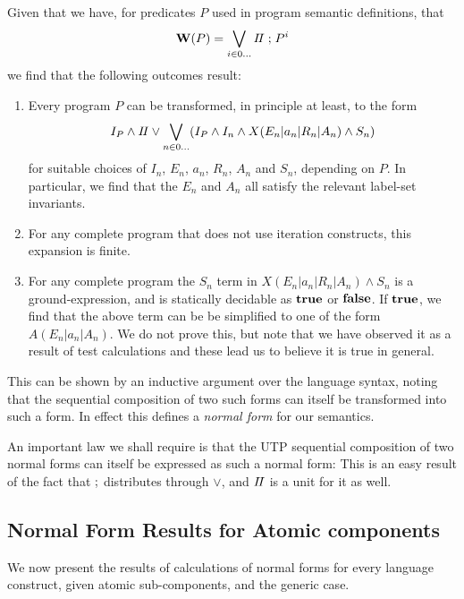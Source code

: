 Given that we have,
for predicates $P$ used in program semantic definitions,
that
\[
  \mathbf{W}(P) = \bigvee_{i \in 0\dots} I\!I \mathrel{;} P^i
\]
we find that the following outcomes result:
\begin{enumerate}
  \item
    Every program $P$ can be transformed,
    in principle at least,
    to the form
    \[
      I_P \land I\!I
      \lor
      \bigvee_{n \in 0\dots}  (I_P \land I_n \land X(E_n|a_n|R_n|A_n) \land S_n)
    \]
    for suitable choices of $I_n$, $E_n$, $a_n$, $R_n$, $A_n$ and $S_n$,
    depending on $P$.
    In particular, we find that the $E_n$ and $A_n$ all satisfy the relevant
    label-set invariants.
  \item
    For any complete program that does not use iteration constructs,
    this expansion is finite.
  \item
    For any complete program the $S_n$
    term in $X(E_n|a_n|R_n|A_n) \land S_n$
    is a ground-expression, and is statically decidable as $\mathbf{true}$ or $\mathbf{false}$.
    If $\mathbf{true}$, we find that the above term
    can be be simplified to one of the form $A(E_n|a_n|A_n)$.
    We do not prove this, but note that we have observed it as a result
    of test calculations and these lead us to believe it is true in general.
\end{enumerate}
This can be shown by an inductive argument over the language syntax,
noting that the sequential composition of two such forms
can itself be transformed into such a form.
In effect this defines a \emph{normal form} for our semantics.


An important law we shall require is that the UTP sequential
composition of two normal forms can itself be expressed
as such a normal form:
This is an easy result of the fact that $\mathrel{;}$ distributes through $\lor$,
and $I\!I$ is a unit for it as well.


\subsection{Normal Form Results for Atomic components}

We now present the results of calculations of normal forms for every language
construct, given atomic sub-components,
and the generic case.

